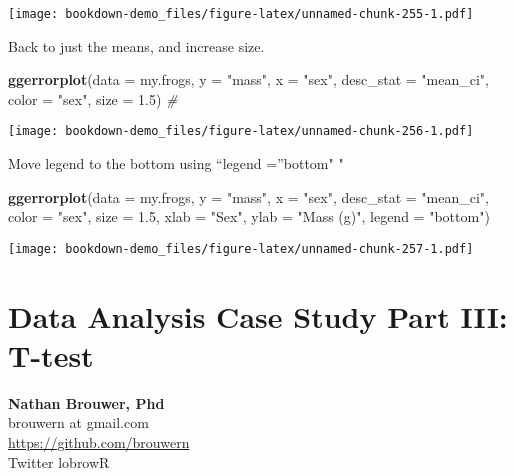 \documentclass[]{book}
\newenvironment{Shaded}{\begin{snugshade}}{\end{snugshade}}
\newcommand{\KeywordTok}[1]{\textcolor[rgb]{0.13,0.29,0.53}{\textbf{#1}}}
\newcommand{\DataTypeTok}[1]{\textcolor[rgb]{0.13,0.29,0.53}{#1}}
\newcommand{\FloatTok}[1]{\textcolor[rgb]{0.00,0.00,0.81}{#1}}
\newcommand{\StringTok}[1]{\textcolor[rgb]{0.31,0.60,0.02}{#1}}
\newcommand{\CommentTok}[1]{\textcolor[rgb]{0.56,0.35,0.01}{\textit{#1}}}
\newcommand{\NormalTok}[1]{#1}
\theoremstyle{definition}
\theoremstyle{definition}
\theoremstyle{definition}
\theoremstyle{remark}
\begin{document}
\texttt{[image: bookdown-demo\_files/figure-latex/unnamed-chunk-255-1.pdf]}

Back to just the means, and increase size.

\begin{Shaded}
\begin{Highlighting}[]
\KeywordTok{ggerrorplot}\NormalTok{(}\DataTypeTok{data =}\NormalTok{ my.frogs,}
          \DataTypeTok{y =} \StringTok{"mass"}\NormalTok{,}
          \DataTypeTok{x =} \StringTok{"sex"}\NormalTok{,}
          \DataTypeTok{desc_stat =} \StringTok{"mean_ci"}\NormalTok{,}
          \DataTypeTok{color =} \StringTok{"sex"}\NormalTok{,}
          \DataTypeTok{size =} \FloatTok{1.5}\NormalTok{) }\CommentTok{#}
\end{Highlighting}
\end{Shaded}

\texttt{[image: bookdown-demo\_files/figure-latex/unnamed-chunk-256-1.pdf]}

Move legend to the bottom using ``legend =''bottom" "

\begin{Shaded}
\begin{Highlighting}[]
\KeywordTok{ggerrorplot}\NormalTok{(}\DataTypeTok{data =}\NormalTok{ my.frogs,}
          \DataTypeTok{y =} \StringTok{"mass"}\NormalTok{,}
          \DataTypeTok{x =} \StringTok{"sex"}\NormalTok{,}
          \DataTypeTok{desc_stat =} \StringTok{"mean_ci"}\NormalTok{,}
          \DataTypeTok{color =} \StringTok{"sex"}\NormalTok{,}
          \DataTypeTok{size =} \FloatTok{1.5}\NormalTok{,}
          \DataTypeTok{xlab =} \StringTok{"Sex"}\NormalTok{,}
          \DataTypeTok{ylab =} \StringTok{"Mass (g)"}\NormalTok{,}
          \DataTypeTok{legend =} \StringTok{"bottom"}\NormalTok{) }
\end{Highlighting}
\end{Shaded}

\texttt{[image: bookdown-demo\_files/figure-latex/unnamed-chunk-257-1.pdf]}

\chapter{Data Analysis Case Study Part III:
T-test}\label{data-analysis-case-study-part-iii-t-test}

\textbf{Nathan Brouwer, Phd}\\
brouwern at gmail.com\\
\url{https://github.com/brouwern}\\
Twitter lobrowR
\end{document}
